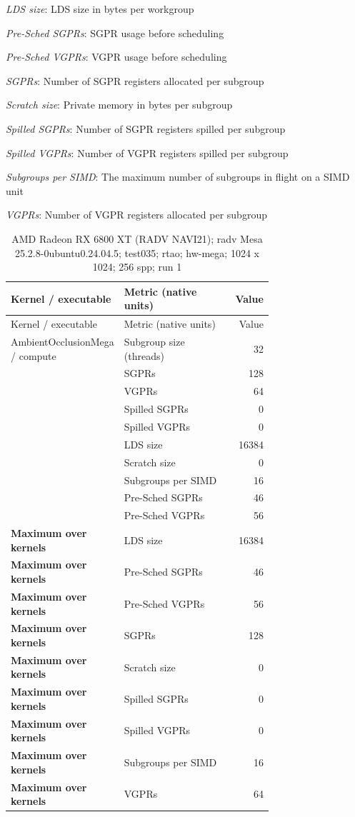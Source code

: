 \noindent\textit{LDS size}: LDS size in bytes per workgroup\par
\noindent\textit{Pre-Sched SGPRs}: SGPR usage before scheduling\par
\noindent\textit{Pre-Sched VGPRs}: VGPR usage before scheduling\par
\noindent\textit{SGPRs}: Number of SGPR registers allocated per subgroup\par
\noindent\textit{Scratch size}: Private memory in bytes per subgroup\par
\noindent\textit{Spilled SGPRs}: Number of SGPR registers spilled per subgroup\par
\noindent\textit{Spilled VGPRs}: Number of VGPR registers spilled per subgroup\par
\noindent\textit{Subgroups per SIMD}: The maximum number of subgroups in flight on a SIMD unit\par
\noindent\textit{VGPRs}: Number of VGPR registers allocated per subgroup\par
\begin{longtable}{p{0.30\linewidth}p{0.43\linewidth}r}
\caption{AMD Radeon RX 6800 XT (RADV NAVI21); radv Mesa 25.2.8-0ubuntu0.24.04.5; test035; rtao; hw-mega; 1024 x 1024; 256 spp; run 1}\label{tab:hydra-profile-26}\\
\hline Kernel / executable & Metric (native units) & Value \\\hline
\endfirsthead
\hline Kernel / executable & Metric (native units) & Value \\\hline
\endhead
AmbientOcclusionMega / compute & Subgroup size (threads) & 32 \\
 & SGPRs & 128 \\
 & VGPRs & 64 \\
 & Spilled SGPRs & 0 \\
 & Spilled VGPRs & 0 \\
 & LDS size & 16384 \\
 & Scratch size & 0 \\
 & Subgroups per SIMD & 16 \\
 & Pre-Sched SGPRs & 46 \\
 & Pre-Sched VGPRs & 56 \\
\hline
\textbf{Maximum over kernels} & LDS size & 16384 \\
\textbf{Maximum over kernels} & Pre-Sched SGPRs & 46 \\
\textbf{Maximum over kernels} & Pre-Sched VGPRs & 56 \\
\textbf{Maximum over kernels} & SGPRs & 128 \\
\textbf{Maximum over kernels} & Scratch size & 0 \\
\textbf{Maximum over kernels} & Spilled SGPRs & 0 \\
\textbf{Maximum over kernels} & Spilled VGPRs & 0 \\
\textbf{Maximum over kernels} & Subgroups per SIMD & 16 \\
\textbf{Maximum over kernels} & VGPRs & 64 \\
\hline
\end{longtable}
